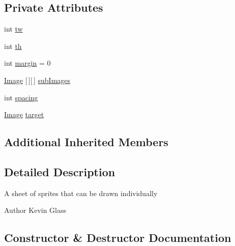 \subsection*{Private Attributes}
\begin{DoxyCompactItemize}
\item 
int \mbox{\hyperlink{classorg_1_1newdawn_1_1slick_1_1_sprite_sheet_a98ea5eda333db800a8e0ab4251bacfdc}{tw}}
\item 
int \mbox{\hyperlink{classorg_1_1newdawn_1_1slick_1_1_sprite_sheet_a9bb93039202eef9a5284f5d5565b23c9}{th}}
\item 
int \mbox{\hyperlink{classorg_1_1newdawn_1_1slick_1_1_sprite_sheet_a971a0145bb69e5bf2ae0432b7f2a69f5}{margin}} = 0
\item 
\mbox{\hyperlink{classorg_1_1newdawn_1_1slick_1_1_image}{Image}} \mbox{[}$\,$\mbox{]}\mbox{[}$\,$\mbox{]} \mbox{\hyperlink{classorg_1_1newdawn_1_1slick_1_1_sprite_sheet_a4aa6be08aecfbd439794ca984ce6e44c}{sub\+Images}}
\item 
int \mbox{\hyperlink{classorg_1_1newdawn_1_1slick_1_1_sprite_sheet_acfe40394e52d34270bc42e936472b5a6}{spacing}}
\item 
\mbox{\hyperlink{classorg_1_1newdawn_1_1slick_1_1_image}{Image}} \mbox{\hyperlink{classorg_1_1newdawn_1_1slick_1_1_sprite_sheet_a54e0b09e9140db02bc11ac22fff5d464}{target}}
\end{DoxyCompactItemize}
\subsection*{Additional Inherited Members}


\subsection{Detailed Description}
A sheet of sprites that can be drawn individually

\begin{DoxyAuthor}{Author}
Kevin Glass 
\end{DoxyAuthor}


\subsection{Constructor \& Destructor Documentation}
\mbox{\label{classorg_1_1newdawn_1_1slick_1_1_sprite_sheet_af85d7abd2fa01203c49cf0de15f35987}} 

